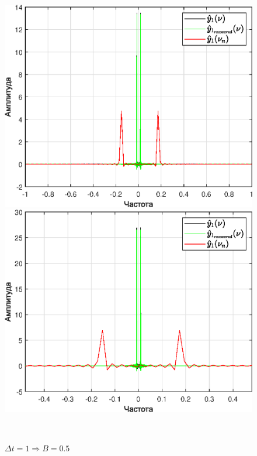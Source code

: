 \documentclass[a4paper]{article}
\begin{document}
\begin{figure}[H]
    \begin{minipage}{0.5\textwidth}
        \centering \includegraphics[width=\textwidth]{graphs2/T_50_dt_0.5_B_1_dv_0.02/func1_image.eps}
        \caption{$\Delta t = 0.5 \Rightarrow B = 1$}
    \end{minipage}\hfill
    \begin{minipage}{0.5\textwidth}
        \centering \includegraphics[width=\textwidth]{graphs2/T_50_dt_1_B_0.5_dv_0.02/func1_image.eps}
        \caption{$\Delta t = 1 \Rightarrow B = 0.5$}
    \end{minipage}\\[1em]
\end{figure}\noindent\
\end{document}
